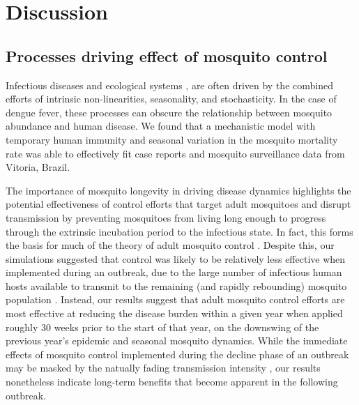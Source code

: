 \documentclass[10pt,letterpaper]{article}
\begin{document}
\section*{Discussion}

\subsection*{Processes driving effect of mosquito control}

Infectious diseases \cite{Ellner1998,Koelle2004} and ecological systems \cite{Bjornstad2001}, are often driven by the combined efforts of intrinsic non-linearities, seasonality, and stochasticity.
In the case of dengue fever, these processes can obscure the relationship between mosquito abundance and human disease.
We found that a mechanistic model with temporary human immunity and seasonal variation in the mosquito mortality rate was able to effectively fit case reports and mosquito surveillance data from Vitoria, Brazil.

The importance of mosquito longevity in driving disease dynamics highlights the potential effectiveness of control efforts that target adult mosquitoes and disrupt transmission by preventing mosquitoes from living long enough to progress through the extrinsic incubation period to the infectious state.
In fact, this forms the basis for much of the theory of adult mosquito control \cite{Burattini2008, Morrison2008, Smith2012}.
Despite this, our simulations suggested that control was likely to be relatively less effective when implemented during an outbreak, due to the large number of infectious human hosts available to transmit to the remaining (and rapidly rebounding) mosquito population \cite{Newton1992, Burattini2008}.
Instead, our results suggest that adult mosquito control efforts are most effective at reducing the disease burden within a given year when applied roughly 30 weeks prior to the start of that year, on the downswing of the previous year's epidemic and seasonal mosquito dynamics.
While the immediate effects of mosquito control implemented during the decline phase of an outbreak may be masked by the natually fading transmission intensity \cite{Stoddard2014}, our results nonetheless indicate long-term benefits that become apparent in the following outbreak.
\end{document}
